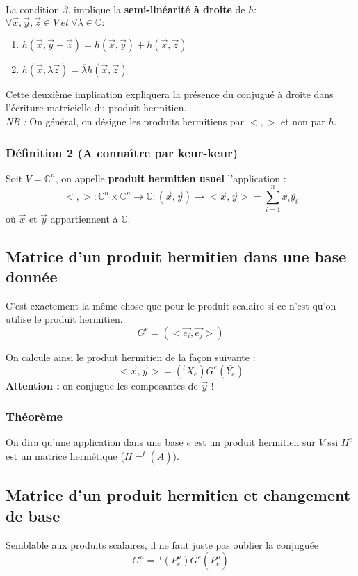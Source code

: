 \documentclass[12pt, a4paper]{article}
\begin{document}
La condition \textit{3.} implique la \textbf{semi-linéarité à droite} de $h$:\\
$\forall \vec{x}, \vec{y}, \vec{z} \in V\ et\ \forall \lambda \in \mathbb{C} :$
\begin{enumerate}
\item $h(\vec{x}, \vec{y} + \vec{z}) = h(\vec{x}, \vec{y}) + h(\vec{x}, \vec{z})$
\item $h(\vec{x}, \lambda\vec{z}) = \overline{\lambda}h(\vec{x}, \vec{z})$
\end{enumerate}
Cette deuxième implication expliquera la présence du conjugué à droite dans l'écriture matricielle du produit hermitien. \\
\textit{NB :} On général, on désigne les produits hermitiens par $< , >$ et non par $h$.

\subsubsection*{Définition 2 (A connaître par keur-keur)}
Soit $V = \mathbb{C}^n$, on appelle \textbf{produit hermitien usuel} l'application :
$$< , > : \mathbb{C}^n  \times \mathbb{C}^n \rightarrow \mathbb{C} : (\vec{x}, \vec{y}) \rightarrow <\vec{x}, \vec{y}> = \sum_{i=1}^n x_i\overline{y_i}$$
où $\vec{x}$ et $\vec{y}$ appartiennent à $\mathbb{C}$.

\subsection{Matrice d'un produit hermitien dans une base donnée}
C'est exactement la même chose que pour le produit scalaire si ce n'est qu'on utilise le produit hermitien.
$$G^e = \left( <\vec{e_i}, \vec{e_j}>\right)$$

On calcule ainsi le produit hermitien de la façon suivante : 
$$<\vec{x}, \vec{y}> = \left(^t X_e\right)G^e\left(\overline{Y_e}\right)$$
\textbf{Attention :} on conjugue les composantes de $\vec{y}$ !

\subsubsection*{Théorème}
On dira qu'une application dans une base $e$ est un produit hermitien sur $V$ ssi $H^e$ est un matrice hermétique ($H = ^t(\overline{A})$).

\subsection{Matrice d'un produit hermitien et changement de base}
Semblable aux produits scalaires, il ne faut juste pas oublier la conjuguée
$$G^u =\ ^t(P^u_e) G^e (\overline{P^u_e})$$
\end{document}
